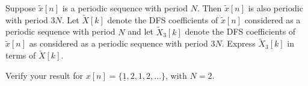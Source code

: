 \documentclass[11pt]{article}
\begin{document}
Suppose $\tilde{x}[n]$ is a periodic sequence with period $N$. Then $\tilde{x}[n]$ is also periodic with period $3N$. Let $\tilde{X}[k]$ denote the DFS coefficients of $\tilde{x}[n]$ considered as a periodic sequence with period $N$ and let $\tilde{X}_3[k]$ denote the DFS coefficients of $\tilde{x}[n]$ as considered as a periodic sequence with period $3N$. Express $\tilde{X}_3[k]$ in terms of $\tilde{X}[k]$.

Verify your result for $x[n]=\{\underline{1},2,1,2,...\}$, with $N=2$.

\end{document}
